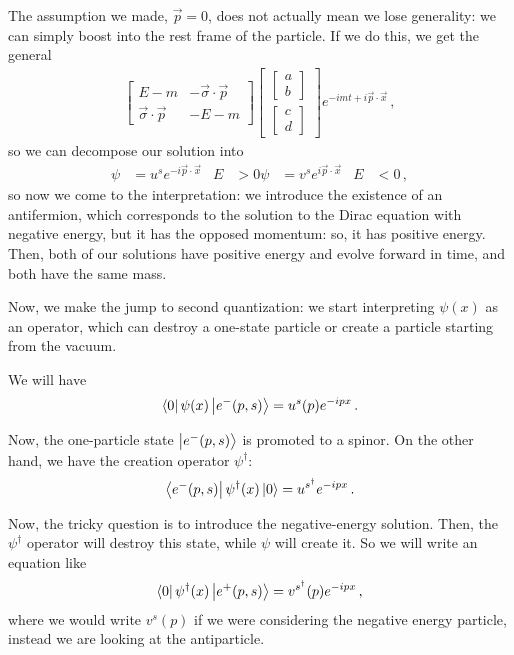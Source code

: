 \documentclass[main.tex]{subfiles}
\begin{document}
The assumption we made, \(\vec{p} = 0\), does not actually mean we lose generality: we can simply boost into the rest frame of the particle.
If we do this, we get the general 
%
\begin{align}
\left[\begin{array}{cc}
E-m & - \vec{\sigma} \cdot \vec{p} \\ 
\vec{\sigma} \cdot \vec{p} & -E-m
\end{array}\right]
\left[\begin{array}{c}
\left[\begin{array}{c}
a \\ 
b
\end{array}\right] \\ 
\left[\begin{array}{c}
c \\ 
d
\end{array}\right]
\end{array}\right]
e^{-imt + i \vec{p} \cdot \vec{x}}
\,,
\end{align}
%
so we can decompose our solution into 
%
\begin{align}
\psi &= u^{s} e^{-i \vec{p} \cdot \vec{x}} & E&>0
\psi &= v^{s} e^{i \vec{p} \cdot \vec{x}} & E&<0
\,,
\end{align}
%
so now we come to the interpretation: we introduce the existence of an antifermion, which corresponds to the solution to the Dirac equation with negative energy, but it has the opposed momentum: so, it has positive energy.
Then, both of our solutions have positive energy and evolve forward in time, and both have the same mass. 

Now, we make the jump to second quantization: we start interpreting \(\psi (x) \) as an operator, which can destroy a one-state particle or create a particle starting from the vacuum. 

We will have 
%
\begin{align}
\bra{0} \psi (x) \ket{e^{-}(p,s)} = u^{s} (p) e^{-ipx}
\,.
\end{align}

Now, the one-particle state \(\ket{e^{-}(p, s)}\) is promoted to a spinor. 
On the other hand, we have the creation operator \(\psi ^\dag\): 
%
\begin{align}
\bra{e^{-}(p,s)} \psi ^\dag (x) \ket{0} = u^{s ^\dag} e^{-ipx}
\,.
\end{align}

Now, the tricky question is to introduce the negative-energy solution. 
Then, the \(\psi ^\dag\) operator will destroy this state, while \(\psi \) will create it. 
So we will write an equation like 
%
\begin{align}
\bra{0} \psi ^\dag (x) \ket{e^{+} (p, s)} 
= v^{s ^\dag} (p) e^{-ipx} 
\,,
\end{align}
%
where we would write \(v^{s}(p)\) if we were considering the negative energy particle, instead we are looking at the antiparticle.
\end{document}
